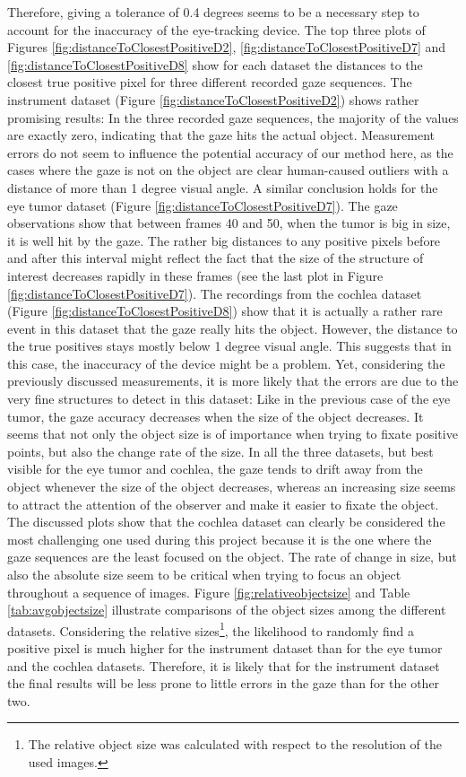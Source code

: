Therefore, giving a tolerance of 0.4 degrees seems to be a necessary step to account for the inaccuracy of the eye-tracking device. The top three plots of Figures \ref{fig:distanceToClosestPositiveD2}, \ref{fig:distanceToClosestPositiveD7} and \ref{fig:distanceToClosestPositiveD8} show for each dataset the distances to the closest true positive pixel for three different recorded gaze sequences. 
The instrument dataset (Figure \ref{fig:distanceToClosestPositiveD2}) shows rather promising results: 
In the three recorded gaze sequences, the majority of the values are exactly zero, indicating that the gaze hits the actual object. 
Measurement errors do not seem to influence the potential accuracy of our method here, as the cases where the gaze is not on the object are clear human-caused outliers with a distance of more than 1 degree visual angle.
A similar conclusion holds for the eye tumor dataset (Figure \ref{fig:distanceToClosestPositiveD7}). 
The gaze observations show that between frames 40 and 50, when the tumor is big in size, it is well hit by the gaze. 
The rather big distances to any positive pixels before and after this interval might reflect the fact that the size of the structure of interest decreases rapidly in these frames (see the last plot in Figure \ref{fig:distanceToClosestPositiveD7}). 
The recordings from the cochlea dataset (Figure \ref{fig:distanceToClosestPositiveD8}) show that it is actually a rather rare event in this dataset that the gaze really hits the object. However, the distance to the true positives stays mostly below 1 degree visual angle. This suggests that in this case, the inaccuracy of the device might be a problem.
Yet, considering the previously discussed measurements, it is more likely that the errors are due to the very fine structures to detect in this dataset: Like in the previous case of the eye tumor, the gaze accuracy decreases when the size of the object decreases. 
It seems that not only the object size is of importance when trying to fixate positive points, but also the change rate of the size. In all the three datasets, but best visible for the eye tumor and cochlea, the gaze tends to drift away from the object whenever the size of the object decreases, whereas an increasing size seems to attract the attention of the observer and make it easier to fixate the object. 
The discussed plots show that the cochlea dataset can clearly be considered the most challenging one used during this project because it is the one where the gaze sequences are the least focused on the object. 
The rate of change in size, but also the absolute size seem to be critical when trying to focus an object throughout a sequence of images. Figure \ref{fig:relativeobjectsize} and Table \ref{tab:avgobjectsize} illustrate comparisons of the object sizes among the different datasets. Considering the relative sizes\footnote{The relative object size was calculated with respect to the resolution of the used images.}, the likelihood to randomly find a positive pixel is much higher for the instrument dataset than for the eye tumor and the cochlea datasets. Therefore, it is likely that for the instrument dataset the final results will be less prone to little errors in the gaze than for the other two. 

